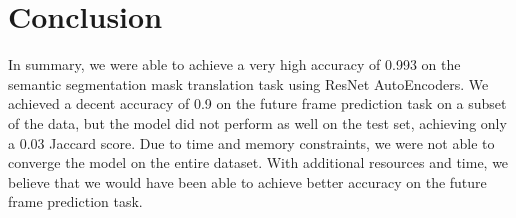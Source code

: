 \documentclass{article}
\begin{document}
\section{Conclusion}
In summary, we were able to achieve a very high accuracy of 0.993 on the semantic segmentation
mask translation task using ResNet AutoEncoders. We achieved a decent accuracy of 0.9 on the
future frame prediction task on a subset of the data, but the model did not perform as well on
the test set, achieving only a 0.03 Jaccard score. Due to time and memory constraints, we were
not able to converge the model on the entire dataset. With additional resources and time, we
believe that we would have been able to achieve better accuracy on the future frame prediction
task.



\end{document}
